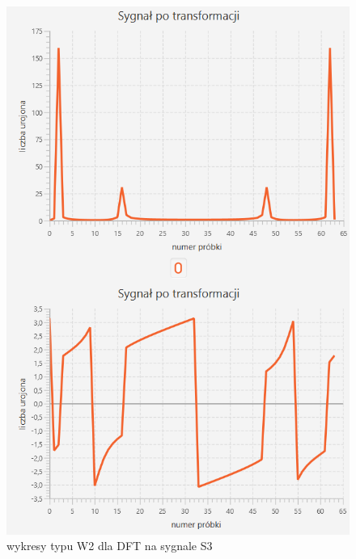 \documentclass[12pt]{article}
\begin{document}
\begin{figure}[H]
	\centering
	\includegraphics[width=\linewidth]{S3_DFT_W2.png}
	\caption{wykresy typu W2 dla DFT na sygnale S3}
	\label{S3_DFT_W2}
\end{figure}
\end{document}
